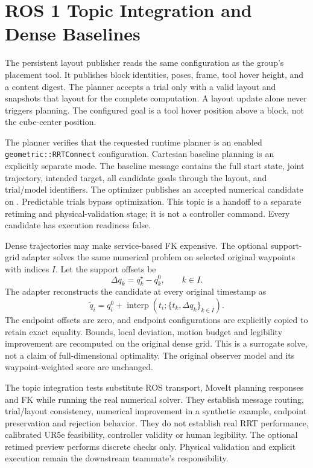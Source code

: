 \documentclass[11pt]{article}
\begin{document}
\section{ROS 1 Topic Integration and Dense Baselines}

The persistent layout publisher reads the same configuration as the group's
placement tool. It publishes block identities, poses, frame, tool hover height,
and a content digest. The planner accepts a trial only with a valid layout and
snapshots that layout for the complete computation. A layout update alone never
triggers planning. The configured goal is a tool hover position above a block,
not the cube-center position.

The planner verifies that the requested runtime planner is an enabled
\texttt{geometric::RRTConnect} configuration. Cartesian baseline planning is an
explicitly separate mode. The baseline message contains the full start state,
joint trajectory, intended target, all candidate goals through the layout, and
trial/model identifiers. The optimizer publishes an accepted numerical candidate
on . Predictable trials bypass optimization.
This topic is a handoff to a separate retiming and physical-validation stage;
it is not a controller command. Every candidate has execution readiness false.

Dense trajectories may make service-based FK expensive. The optional support-grid
adapter solves the same numerical problem on selected original waypoints with
indices $I$. Let the support offsets be
\[
\Delta q_k = q_k^{\star} - q_k^0, \qquad k\in I.
\]
The adapter reconstructs the candidate at every original timestamp as
\[
\widetilde q_i = q_i^0 +
\operatorname{interp}\!\left(t_i;\{t_k,\Delta q_k\}_{k\in I}\right).
\]
The endpoint offsets are zero, and endpoint configurations are explicitly copied
to retain exact equality. Bounds, local deviation, motion budget and legibility
improvement are recomputed on the original dense grid. This is a surrogate solve,
not a claim of full-dimensional optimality. The original observer model and its
waypoint-weighted score are unchanged.



The topic integration tests substitute ROS transport, MoveIt planning responses
and FK while running the real numerical solver. They establish message routing,
trial/layout consistency, numerical improvement in a synthetic example, endpoint
preservation and rejection behavior. They do not establish real RRT performance,
calibrated UR5e feasibility, controller validity or human legibility. The optional
retimed preview performs discrete checks only. Physical validation and explicit
execution remain the downstream teammate's responsibility.
\end{document}
